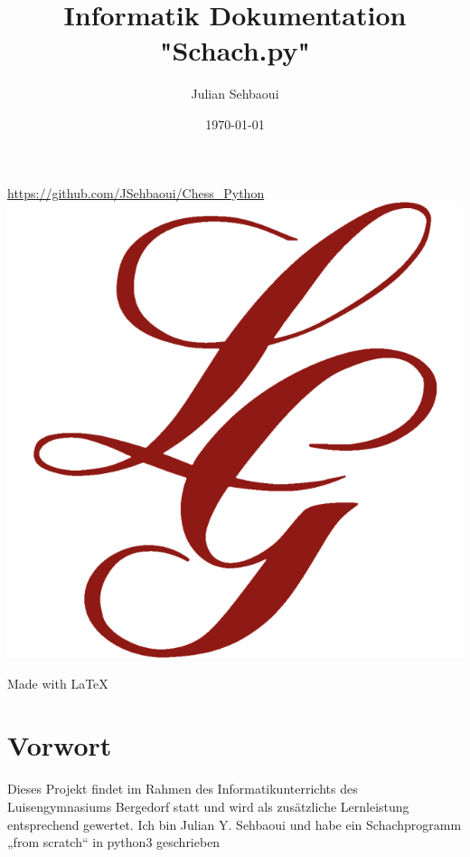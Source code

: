 \documentclass[a4paper, 10pt]{scrartcl}
\title{Informatik Dokumentation "Schach.py"}
\author{Julian Sehbaoui}
\date{\today}
\begin{document}
\begin{titlepage}
        \maketitle
        \centering
        \url{https://github.com/JSehbaoui/Chess_Python}\\
         \vspace{5pt} 
        \includegraphics[scale=0.35]{assets/luisengymnasium.png}\\
         \vspace{5pt} 
        
        Made with \LaTeX{}
\end{titlepage}

\pagebreak
\tableofcontents
\pagebreak

\section{Vorwort}
Dieses Projekt findet im Rahmen des Informatikunterrichts des Luisengymnasiums 	Bergedorf statt und wird als zusätzliche Lernleistung entsprechend gewertet.
Ich bin Julian Y. Sehbaoui und habe ein Schachprogramm „from scratch“ in python3 geschrieben
\end{document}
